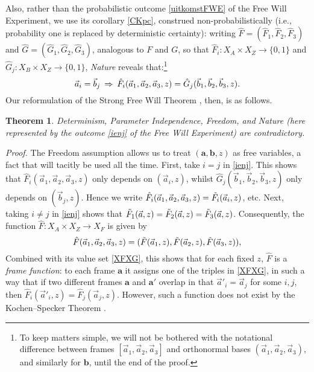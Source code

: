 \documentclass[11pt]{article}
\newtheorem{Theorem}[Definition]{Theorem}
\newcommand{\raw}{\rightarrow} \newcommand{\rat}{\mapsto}
\newcommand{\x}{\times} \newcommand{\hb}{\hbar}
\newcommand{\er}{\eqref}
\newcommand{\ba}{\mathbf{a}}\newcommand{\bb}{\mathbf{b}}
\begin{document}
Also, rather than the probabilistic outcome  \er{uitkomstFWE} of the Free Will Experiment, we use its corollary \er{CKpc}, construed non-probabilistically (i.e., probability one is replaced by deterministic certainty):  writing $\hat{F}=(\hat{F}_1,\hat{F}_2,\hat{F}_3)$ and  $\hat{G}=(\hat{G}_1,\hat{G}_2,\hat{G}_3)$, analogous to $F$ and $G$, so that $\hat{F}_i:X_A \x X_Z\raw \{0,1\}$ and $\hat{G}_j:X_B \x X_Z\raw \{0,1\}$, \emph{Nature} reveals that:\footnote{To keep matters simple, we will not be bothered with the notational difference between frames $[\vec{a}_1,\vec{a}_2,\vec{a}_3]$ and orthonormal bases $(\vec{a}_1,\vec{a}_2,\vec{a}_3)$, and similarly for $\bb$, until the end of the proof.}
 \begin{equation}
\vec{a}_i=\vec{b}_j\: \Rightarrow\: \hat{F}_i(\vec{a}_1,\vec{a}_2,\vec{a}_3,z)=\hat{G}_j(\vec{b}_1,\vec{b}_2,\vec{b}_3,z). \label{ienj}
\end{equation}
Our reformulation of the Strong Free Will Theorem \cite{BS,Clifton,CK2,HR,Stairs}, then, is as follows.
\begin{Theorem}\label{CKFWT}
Determinism, Parameter Independence, Freedom,  and Nature (here represented by the outcome \er{ienj} of the Free Will Experiment) are  contradictory.
\end{Theorem}
\newpage
\emph{Proof.} 
The Freedom assumption allows us to treat $(\ba,\bb,z)$ as free variables, a fact that will tacitly be used all the time.
First, take $i=j$ in \er{ienj}. This shows that  $\hat{F}_i(\vec{a}_1,\vec{a}_2,\vec{a}_3,z)$ only depends on $(\vec{a}_i,z)$, whilst
$\hat{G}_j(\vec{b}_1,\vec{b}_2,\vec{b}_3,z)$ only depends on $(\vec{b}_j,z)$. Hence we write $\hat{F}_i(\vec{a}_1,\vec{a}_2,\vec{a}_3,z)=\tilde{F}_i(\vec{a}_i,z)$, etc. 
Next, taking 
 $i\neq j$ in \er{ienj} shows that $\tilde{F}_1(\vec{a},z)=\tilde{F}_2(\vec{a},z)=\tilde{F}_3(\vec{a},z)$.
Consequently, the function  $\hat{F}:X_A \x X_Z\raw X_F$ is given by
\begin{equation}
\hat{F}(\vec{a}_1,\vec{a}_2,\vec{a}_3,z)=(\tilde{F}(\vec{a}_1,z),\tilde{F}(\vec{a}_2,z),\tilde{F}(\vec{a}_3,z)),
\end{equation}
Combined with its value set \er{XFXG}, this
shows that for each fixed $z$, $\hat{F}$ is a \emph{frame function}: to each frame $\ba$ it assigns one of the triples in \er{XFXG}, in such a way that if two different frames $\ba$ and $\ba'$ overlap in that $\vec{a}'_i=\vec{a}_j$ for some $i,j$, then $\hat{F}_i(\vec{a}'_i,z)=\hat{F}_j(\vec{a}_j,z)$.
However, such a function does not exist by the Kochen--Specker Theorem \cite{KS,Peres}.\enp
\end{document}
